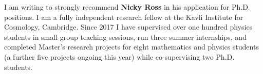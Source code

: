 I am writing to strongly recommend \textbf{Nicky Ross} in his application for Ph.D. positions. I am a fully independent research fellow at the Kavli Institute for Cosmology, Cambridge. Since 2017 I have supervised over one hundred physics students in small group teaching sessions, run three summer internships, and completed Master’s research projects for eight mathematics and physics students (a further five projects ongoing this year) while co-supervising two Ph.D. students.
